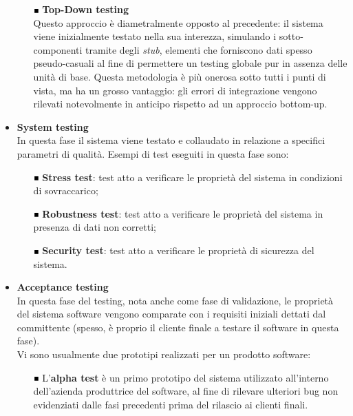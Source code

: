 \begin{itemize}
\begin{itemize}
\item [$ \Blacksquare $] \textbf{Top-Down testing}\\
Questo approccio è diametralmente opposto al precedente: il sistema viene inizialmente testato nella sua interezza, simulando i sotto-componenti tramite degli \emph{stub}, elementi che forniscono dati spesso pseudo-casuali al fine di permettere un testing globale pur in assenza delle unità di base. Questa metodologia è più onerosa sotto tutti i punti di vista, ma ha un grosso vantaggio: gli errori di integrazione vengono rilevati notevolmente in anticipo rispetto ad un approccio bottom-up.\\
\end{itemize}

\item \textbf{System testing}\\
In questa fase il sistema viene testato e collaudato in relazione a specifici parametri di qualità. Esempi di test eseguiti in questa fase sono:
\begin{itemize}
\item [$ \Blacksquare $] \textbf{Stress test}: test atto a verificare le proprietà del sistema in condizioni di sovraccarico;
\item [$ \Blacksquare $] \textbf{Robustness test}: test atto a verificare le proprietà del sistema in presenza di dati non corretti;
\item [$ \Blacksquare $] \textbf{Security test}: test atto a verificare le proprietà di sicurezza del sistema.
\end{itemize}

\clearpage

\item \textbf{Acceptance testing}\\
In questa fase del testing, nota anche come fase di validazione, le proprietà del sistema software vengono comparate con i requisiti iniziali dettati dal committente (spesso, è proprio il cliente finale a testare il software in questa fase).\\
Vi sono usualmente due prototipi realizzati per un prodotto software:

\begin{itemize}
\item [$ \Blacksquare $] L'\textbf{alpha test} è un primo prototipo del sistema utilizzato all'interno dell'azienda produttrice del software, al fine di rilevare ulteriori bug non evidenziati dalle fasi precedenti prima del rilascio ai clienti finali.\\


\end{itemize}
\end{itemize}
